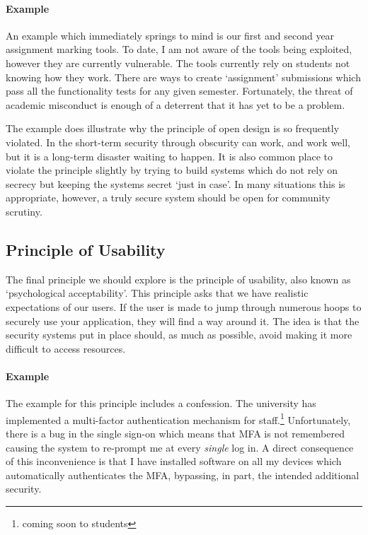 \paragraph{Example}
An example which immediately springs to mind is our first and second year assignment marking tools.
To date, I am not aware of the tools being exploited, however they are currently vulnerable.
The tools currently rely on students not knowing how they work.
There are ways to create `assignment' submissions which pass all the functionality tests for any given semester.
Fortunately, the threat of academic misconduct is enough of a deterrent that it has yet to be a problem.

The example does illustrate why the principle of open design is so frequently violated.
In the short-term security through obscurity can work, and work well, but it is a long-term disaster waiting to happen.
It is also common place to violate the principle slightly by trying to build systems which do not rely on secrecy but keeping the systems secret `just in case'.
In many situations this is appropriate, however, a truly secure system should be open for community scrutiny.

\subsection{Principle of Usability}

\noindent
The final principle we should explore is the principle of usability, also known as `psychological acceptability'.
This principle asks that we have realistic expectations of our users.
If the user is made to jump through numerous hoops to securely use your application, they will find a way around it.
The idea is that the security systems put in place should, as much as possible, avoid making it more difficult to access resources.

\paragraph{Example}
The example for this principle includes a confession.
The university has implemented a multi-factor authentication mechanism for staff.\footnote{coming soon to students}
Unfortunately, there is a bug in the single sign-on which means that MFA is not remembered causing the system to re-prompt me at every \textsl{single} log in.
A direct consequence of this inconvenience is that I have installed software on all my devices which automatically authenticates the MFA,
bypassing, in part, the intended additional security.

